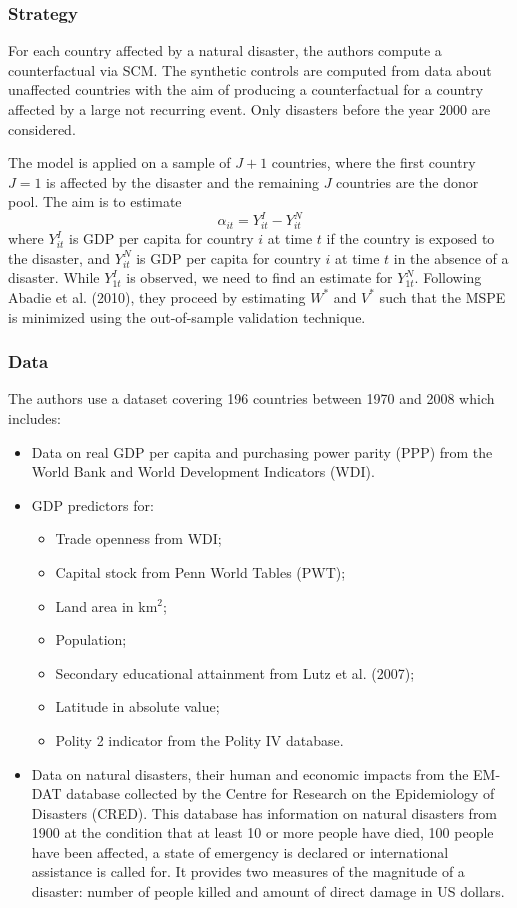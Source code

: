 \documentclass[12pt,a4paper,draft]{article}
\begin{document}
\subsubsection*{Strategy}
For each country affected by a natural disaster, the authors compute a counterfactual 
via SCM. The synthetic controls are computed from data about unaffected countries with 
the aim of producing a counterfactual for a country affected by a large not recurring 
event. Only disasters before the year 2000 are considered.

The model is applied on a sample of $J+1$ countries, where the first country $J=1$ is 
affected by the disaster and the remaining $J$ countries are the donor pool. The aim is 
to estimate $$\alpha_{it} = Y^I_{it} - Y^N_{it}$$ where $Y^I_{it}$ is GDP per capita 
for country $i$ at time $t$ if the country is exposed to the disaster, and $Y^N_{it}$ 
is GDP per capita for country $i$ at time $t$ in the absence of a disaster. 
While $Y^I_{1t}$ is observed, we need to find an estimate for $Y^N_{1t}$. 
Following Abadie et al. (2010), they proceed by estimating $W^*$ and $V^*$ such that 
the MSPE is minimized using the out-of-sample validation technique. 


\subsubsection*{Data}
The authors use a dataset covering 196 countries between 1970 and 2008 which includes:
\begin{itemize}
    \item Data on real GDP per capita and purchasing power parity (PPP) from the World 
    Bank and World Development Indicators (WDI).
    \item GDP predictors for:
    \begin{itemize}
        \item Trade openness from WDI;
        \item Capital stock from Penn World Tables (PWT);
        \item Land area in km$^2$;
        \item Population;
        \item Secondary educational attainment from Lutz et al. (2007);
        \item Latitude in absolute value;
        \item Polity 2 indicator from the Polity IV database.
    \end{itemize}
    \item Data on natural disasters, their human and economic impacts from the EM-DAT 
    database collected by the Centre for Research on the Epidemiology of Disasters (CRED). 
    This database has information on natural disasters from 1900 at the condition that 
    at least 10 or more people have died, 100 people have been affected, a state of 
    emergency is declared or international assistance is called for. It provides two measures 
    of the magnitude of a disaster: number of people killed and amount of direct damage in 
    US dollars.
     
\end{itemize}
\end{document}
